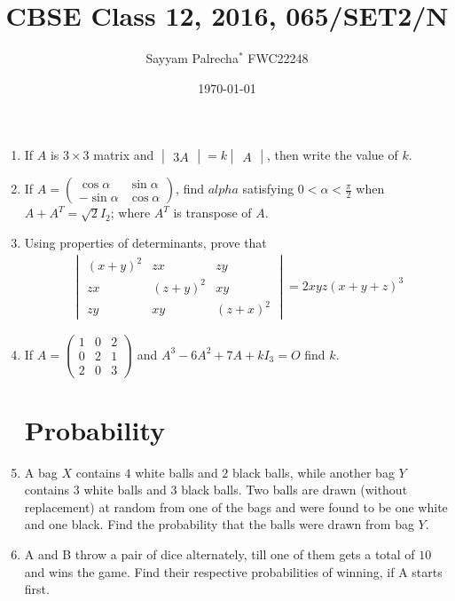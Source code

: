 \documentclass[10pt,-letter paper]{article}
\providecommand{\brak}[1]{\ensuremath{\left(#1\right)}}
\newcommand{\myvec}[1]{\ensuremath{\begin{pmatrix}#1\end{pmatrix}}}
\newcommand{\mydet}[1]{\ensuremath{\begin{vmatrix}#1\end{vmatrix}}}
\begin{document}
\author{Sayyam Palrecha$^{*}$ FWC22248}
\title{CBSE Class 12, 2016, 065/SET2/N}
\date{\today}

\maketitle

\bigskip

\begin{enumerate}

\section{Matrices}

\item If $A$ is $3\times 3$ matrix and $\mydet{3A} = k\mydet{A}$, then write the value of $k$.

\item If $A = \myvec{\cos{\alpha} & \sin{\alpha}\\ -\sin{\alpha} & \cos{\alpha}}$, find $alpha$ satisfying $0 < \alpha < \frac{\pi}{2}$ when $A + A^T = \sqrt{2}I_2$; where $A^T$ is transpose of $A$.

\item Using properties of determinants, prove that
\begin{align*}\mydet{\brak{x+y}^2 & zx & zy \\ zx & \brak{z+y}^2 & xy \\ zy & xy & \brak{z+x}^2} = 2xyz\brak{x+y+z}^3
\end{align*}

\item If $A = \myvec{1 & 0 & 2 \\ 0 & 2 & 1 \\ 2 & 0 & 3}$ and $A^3 - 6A^2 + 7A + kI_3 = O$ find $k$.

\section{Probability}

\item A bag $X$ contains $4$ white balls and $2$ black balls, while another bag $Y$ contains $3$ white balls and $3$ black balls. Two balls are drawn (without replacement) at random from one of the bags and were found to be one white and one black. Find the probability that the balls were drawn from bag $Y$.

\item A and B throw a pair of dice alternately, till one of them gets a total of $10$ and wins the game. Find their respective probabilities of winning, if A starts first.


\end{enumerate}
\end{document}
